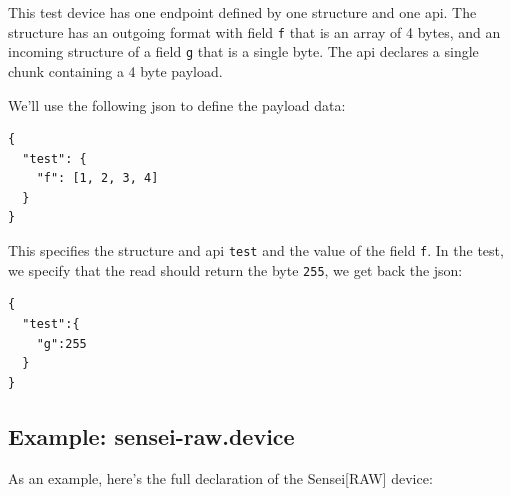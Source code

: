\documentclass[12pt]{article}
\begin{document}
This test device has one endpoint defined by one structure and one
api. The structure has an outgoing format with field \verb|f| that is
an array of 4 bytes, and an incoming structure of a field \verb|g|
that is a single byte. The api declares a single chunk containing a 4
byte payload.

We'll use the following json to define the payload data:

\begin{verbatim}
{
  "test": {
    "f": [1, 2, 3, 4]
  }
}
\end{verbatim}

This specifies the structure and api \verb|test| and the value of the
field \verb|f|. In the test, we specify that the read should return
the byte \verb|255|, we get back the json:

\begin{verbatim}
{
  "test":{
    "g":255
  }
}
\end{verbatim}

\subsection{Example: sensei-raw.device}

As an example, here's the full declaration of the Sensei[RAW] device:
\end{document}
